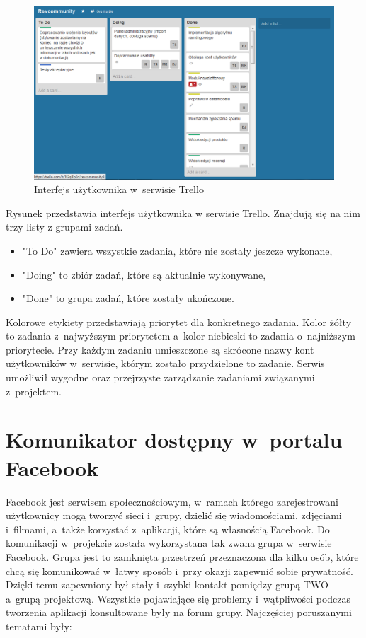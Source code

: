 \begin{figure}[h]
	\centering
	\includegraphics[width=1.00\textwidth]{images/trello.png}
	\caption{Interfejs użytkownika w~serwisie Trello}
\end{figure}


Rysunek przedstawia interfejs użytkownika w serwisie Trello. Znajdują się na nim trzy listy z grupami zadań.

\begin{itemize}
\item "To Do" zawiera wszystkie zadania, które nie zostały jeszcze wykonane,
\item "Doing" to zbiór zadań, które są aktualnie wykonywane,
\item "Done" to grupa zadań, które zostały ukończone.
\end{itemize}


Kolorowe etykiety przedstawiają priorytet dla konkretnego zadania. Kolor żółty to zadania z~najwyższym priorytetem a~kolor niebieski to zadania o~najniższym priorytecie. Przy każdym zadaniu umieszczone są skrócone nazwy kont użytkowników w~serwisie, którym zostało przydzielone to zadanie. 
Serwis umożliwił wygodne oraz przejrzyste zarządzanie zadaniami związanymi z~projektem.

\section{Komunikator dostępny w~portalu Facebook}
Facebook jest serwisem społecznościowym, w~ramach którego zarejestrowani użytkownicy mogą tworzyć sieci i~grupy, dzielić się wiadomościami, zdjęciami i~filmami, a~także korzystać z~aplikacji, które są własnością Facebook. Do komunikacji w~projekcie została wykorzystana tak zwana grupa w~serwisie Facebook. Grupa  jest to zamknięta przestrzeń przeznaczona dla kilku osób, które chcą się komunikować w~łatwy sposób i~przy okazji zapewnić sobie prywatność. Dzięki temu zapewniony był stały i~szybki kontakt pomiędzy grupą TWO a~grupą projektową. Wszystkie pojawiające się problemy i~wątpliwości podczas tworzenia aplikacji konsultowane były na forum grupy. Najczęściej poruszanymi tematami były:

